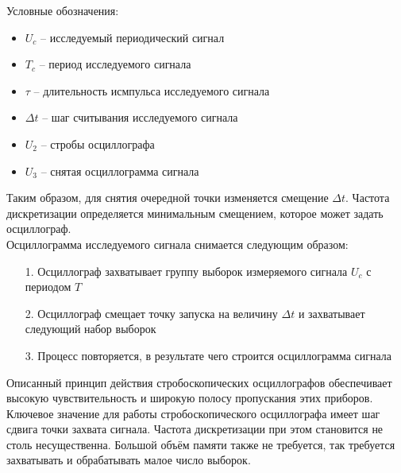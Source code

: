 \noindent Условные обозначения:

\begin{itemize}[label={}]
	\item $ U_{c} $ -- исследуемый периодический сигнал
	\item $ T_{c} $ -- период исследуемого сигнала
	\item $ \tau $ -- длительность исмпульса исследуемого сигнала
	\item $ \Delta t $ -- шаг считывания исследуемого сигнала
	\item $ U_{2} $ -- стробы осциллографа
	\item $ U_{3} $ -- снятая осциллограмма сигнала\\
\end{itemize}

Таким образом, для снятия очередной точки изменяется смещение $ \Delta t $.
Частота дискретизации определяется минимальным смещением, которое может задать осциллограф.\\

\noindent Осциллограмма исследуемого сигнала снимается следующим образом:

\begin{itemize}
    \item[1.] Осциллограф захватывает группу выборок измеряемого сигнала $ U_{c} $ с периодом $ T $
    \item[2.] Осциллограф смещает точку запуска на величину $ \Delta t $ и захватывает следующий набор выборок
    \item[3.] Процесс повторяется, в результате чего строится осциллограмма сигнала\\
\end{itemize}
	
Описанный принцип действия стробоскопических осциллографов обеспечивает высокую чувствительность и широкую полосу пропускания этих приборов.
Ключевое значение для работы стробоскопического осциллографа имеет шаг сдвига точки захвата сигнала.
Частота дискретизации при этом становится не столь несущественна. Большой объём памяти также не требуется,
так требуется захватывать и обрабатывать малое число выборок.


\FloatBarrier
\newpage